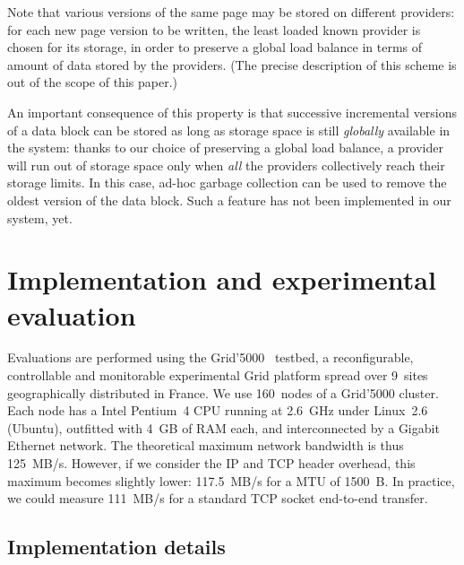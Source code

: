\documentclass{llncs}
\begin{document}
Note that various versions of the same page may be stored on
different providers: for each new page version to be written, the
least loaded known provider is chosen for its storage, in order to
preserve a global load balance in terms of amount of data stored by
the providers. (The precise description of this scheme is out of the scope of
this paper.)

An important consequence of this property is that
successive incremental versions of a data block can be stored as
long as storage space is still \emph{globally} available in the
system: thanks to our choice of preserving a global load balance, a
provider will run out of storage space only when \emph{all} the providers
collectively reach their storage limits. In this case, ad-hoc garbage
collection can be used to remove the oldest version of the data
block. Such a feature has not been implemented in our system, yet.






























\section{Implementation and experimental evaluation}
\label{sec:impl}

Evaluations are performed using the Grid'5000~\cite{Grid5000} testbed,
a reconfigurable, controllable and monitorable experimental Grid
platform spread over 9~sites geographically distributed in France.  We
use 160~nodes of a Grid'5000 cluster. Each node has a Intel Pentium~4
CPU running at 2.6~GHz under Linux~2.6 (Ubuntu), outfitted with 4~GB
of RAM each, and interconnected by a Gigabit Ethernet network. The
theoretical maximum network bandwidth is thus 125~MB/s. However, if we
consider the IP and TCP header overhead, this maximum becomes slightly
lower: 117.5~MB/s for a MTU of 1500~B. In practice, we could measure
111~MB/s for a standard TCP socket end-to-end transfer.

\subsection{Implementation details}
\end{document}
